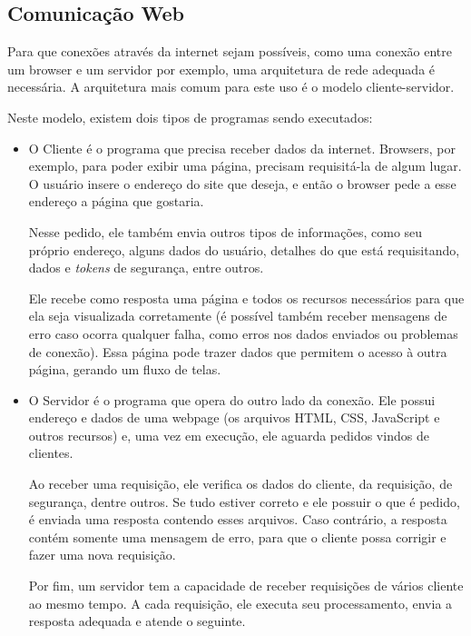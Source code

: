 \documentclass[a4paper,12pt]{article}
\begin{document}
\subsection{Comunicação Web}

Para que conexões através da internet sejam possíveis, como uma conexão entre um browser e um servidor por exemplo, uma arquitetura de rede adequada é necessária. A arquitetura mais comum para este uso é o modelo cliente-servidor.

Neste modelo, existem dois tipos de programas sendo executados:

\begin{itemize}
    \item O Cliente é o programa que precisa receber dados da internet. Browsers, por exemplo, para poder exibir uma página, precisam requisitá-la de algum lugar. O usuário insere o endereço do site que deseja, e então o browser pede a esse endereço a página que gostaria.

    Nesse pedido, ele também envia outros tipos de informações, como seu próprio endereço, alguns dados do usuário, detalhes do que está requisitando, dados e \emph{tokens} de segurança, entre outros.

    Ele recebe como resposta uma página e todos os recursos necessários para que ela seja visualizada corretamente (é possível também receber mensagens de erro caso ocorra qualquer falha, como erros nos dados enviados ou problemas de conexão). Essa página pode trazer dados que permitem o acesso à outra página, gerando um fluxo de telas.

    \item O Servidor é o programa que opera do outro lado da conexão. Ele possui endereço e dados de uma webpage (os arquivos HTML, CSS, JavaScript e outros recursos) e, uma vez em execução, ele aguarda pedidos vindos de clientes.

    Ao receber uma requisição, ele verifica os dados do cliente, da requisição, de segurança, dentre outros. Se tudo estiver correto e ele possuir o que é pedido, é enviada uma resposta contendo esses arquivos. Caso contrário, a resposta contém somente uma mensagem de erro, para que o cliente possa corrigir e fazer uma nova requisição.

    Por fim, um servidor tem a capacidade de receber requisições de vários cliente ao mesmo tempo. A cada requisição, ele executa seu processamento, envia a resposta adequada e atende o seguinte.
\end{itemize}
\end{document}
